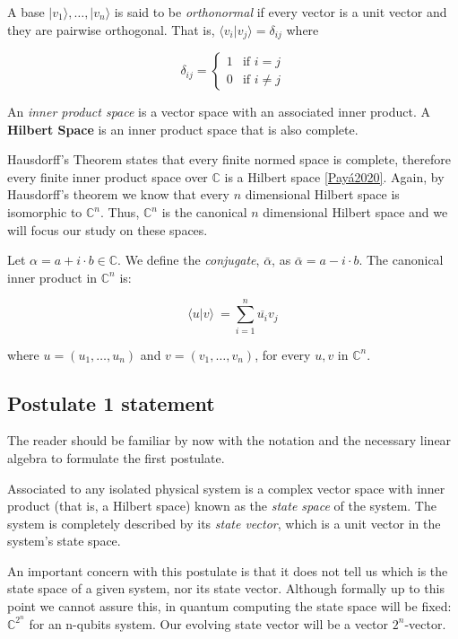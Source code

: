 A base $|v_1\rangle, \dotsc, |v_n\rangle$ is said to be \emph{orthonormal} if every vector is a unit vector and they are pairwise orthogonal. That is, $\langle v_i|v_j\rangle = \delta_{ij}$ where

\[
\delta_{ij} = 
\begin{cases}
	1 & \text{if } i = j  \\
	0 & \text{if } i \neq j
\end{cases}
\]

\begin{definition}
	An \emph{inner product space} is a vector space with an associated inner product. A \textbf{Hilbert Space} is an inner product space that is also complete.
\end{definition}

Hausdorff's Theorem states that every finite normed space is complete, therefore every finite inner product space over $\mathds{C}$ is a Hilbert space \ref{Payá2020}. Again, by Hausdorff's theorem we know that every $n$ dimensional Hilbert space is isomorphic to $\mathds{C}^n$. Thus, $\mathds{C}^n$ is the canonical $n$ dimensional Hilbert space and we will focus our study on these spaces.

Let $\alpha = a + i \cdot b\in \mathds{C}$. We define the \emph{conjugate}, $\bar \alpha$, as $\bar \alpha = a - i \cdot b$. The canonical inner product in $\mathds{C}^n$ is:

$$ \langle u|v \rangle \ = \sum_{i=1}^n \overline{u_i}v_j $$

where $u = (u_1, \dotsc, u_n)$ and $v = (v_1, \dotsc, v_n)$, for every $u,v$ in $\mathds{C}^n$.


\subsection{Postulate 1 statement}


The reader should be familiar by now with the notation and the necessary linear algebra to formulate the first postulate.

\begin{postulate}
	Associated to any isolated physical system is a complex vector space with inner product (that is, a Hilbert space) known as the \emph{state space} of the system. The system is completely described by its \emph{state vector}, which is a unit vector in the system’s state space.
\end{postulate}

An important concern with this postulate is that it does not tell us which is the state space of a given system, nor its state vector. Although formally up to this point we cannot assure this, in quantum computing the state space will be fixed: $\mathds{C}^{2^n}$ for an n-qubits system. Our evolving state vector will be a vector $2^n$-vector.

